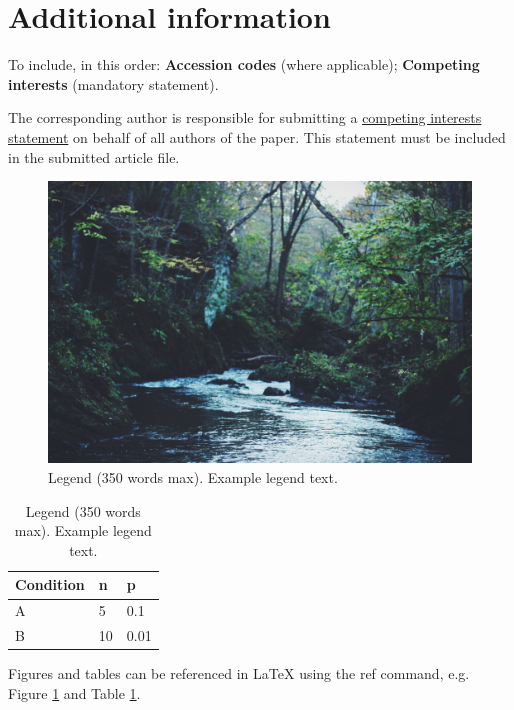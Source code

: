 \documentclass[fleqn,10pt]{wlscirep}
\begin{document}
\section*{Additional information}

To include, in this order: \textbf{Accession codes} (where applicable); \textbf{Competing interests} (mandatory statement). 

The corresponding author is responsible for submitting a \href{http://www.nature.com/srep/policies/index.html#competing}{competing interests statement} on behalf of all authors of the paper. This statement must be included in the submitted article file.

\begin{figure}[ht]
\centering
\includegraphics[width=\linewidth]{stream}
\caption{Legend (350 words max). Example legend text.}
\label{fig:stream}
\end{figure}

\begin{table}[ht]
\centering
\begin{tabular}{|l|l|l|}
\hline
Condition & n & p \\
\hline
A & 5 & 0.1 \\
\hline
B & 10 & 0.01 \\
\hline
\end{tabular}
\caption{\label{tab:example}Legend (350 words max). Example legend text.}
\end{table}

Figures and tables can be referenced in LaTeX using the ref command, e.g. Figure \ref{fig:stream} and Table \ref{tab:example}.
\end{document}
